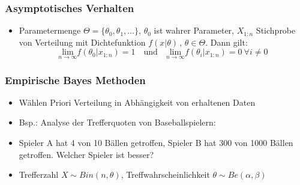 \documentclass[aspectratio=169,xcolor=dvipsnames]{beamer}
\begin{document}
\begin{frame}
\frametitle{Asymptotisches Verhalten}
\begin{itemize}
	\item<1-> Parametermenge $\Theta=\{\theta_0,\theta_1,\dots\}$, $\theta_0$ ist wahrer Parameter, $X_{1:n}$ Stichprobe von Verteilung mit Dichtefunktion $f(x|\theta)\,,\,\theta\in\Theta$. Dann gilt:
	$$\underset{n\rightarrow\infty}{\text{lim}}f(\theta_0|x_{1:n})=1\quad \text{und}\quad \underset{n\rightarrow\infty}{\text{lim}}f(\theta_i|x_{1:n})=0~\forall i\neq 0$$
\end{itemize}
\end{frame}

\begin{frame}
\frametitle{Empirische Bayes Methoden}
\begin{itemize}
	\item<1-> Wählen Priori Verteilung in Abhängigkeit von erhaltenen Daten
	\item<2-> Bsp.: Analyse der Trefferquoten von Baseballspielern:
	\item<3-> Spieler A hat 4 von 10 Bällen getroffen, Spieler B hat 300 von 1000 Bällen getroffen. Welcher Spieler ist besser?
	\item<4-> Trefferzahl $X\sim Bin(n,\theta)$, Treffwahrscheinlichkeit $\theta\sim Be(\alpha,\beta)$
\end{itemize}
\end{frame}
\end{document}
